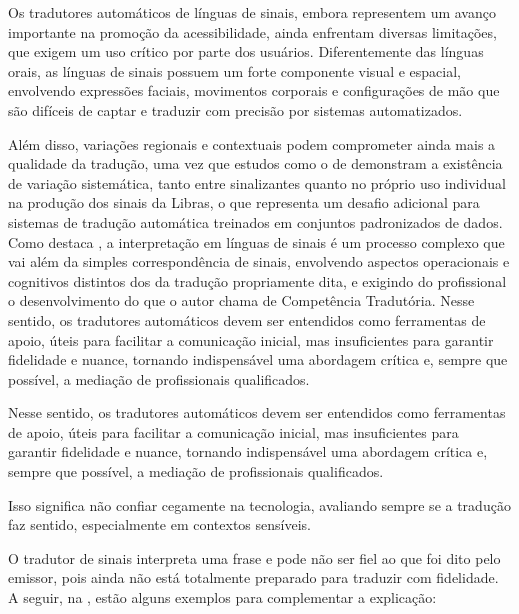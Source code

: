 \documentclass[portuguese]{textolivre}
\begin{document}
Os tradutores automáticos de línguas de sinais, embora representem um avanço importante na promoção da acessibilidade, ainda enfrentam diversas limitações, que exigem um uso crítico por parte dos usuários. Diferentemente das línguas orais, as línguas de sinais possuem um forte componente visual e espacial, envolvendo expressões faciais, movimentos corporais e configurações de mão que são difíceis de captar e traduzir com precisão por sistemas automatizados. 

Além disso, variações regionais e contextuais podem comprometer ainda mais a qualidade da tradução, uma vez que estudos como o de \textcite{XavierBarbosa2014} demonstram a existência de variação sistemática, tanto entre sinalizantes quanto no próprio uso individual na produção dos sinais da Libras, o que representa um desafio adicional para sistemas de tradução automática treinados em conjuntos padronizados de dados. Como destaca \textcite{Rodrigues2018}, a interpretação em línguas de sinais é um processo complexo que vai além da simples correspondência de sinais, envolvendo aspectos operacionais e cognitivos distintos dos da tradução propriamente dita, e exigindo do profissional o desenvolvimento do que o autor chama de Competência Tradutória. Nesse sentido, os tradutores automáticos devem ser entendidos como ferramentas de apoio, úteis para facilitar a comunicação inicial, mas insuficientes para garantir fidelidade e nuance, tornando indispensável uma abordagem crítica e, sempre que possível, a mediação de profissionais qualificados.

Nesse sentido, os tradutores automáticos devem ser entendidos como ferramentas de apoio, úteis para facilitar a comunicação inicial, mas insuficientes para garantir fidelidade e nuance, tornando indispensável uma abordagem crítica e, sempre que possível, a mediação de profissionais qualificados. 

Isso significa não confiar cegamente na tecnologia, avaliando sempre se a tradução faz sentido, especialmente em contextos sensíveis.

O tradutor de sinais interpreta uma frase e pode não ser fiel ao que foi dito pelo emissor, pois ainda não está totalmente preparado para traduzir com fidelidade. A seguir, na , estão alguns exemplos para complementar a explicação:
\end{document}
